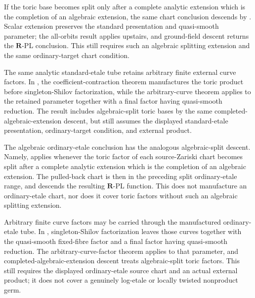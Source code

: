 If the toric base becomes split only after a complete analytic extension
which is the completion of an algebraic extension, the same chart conclusion
descends by .
Scalar extension preserves the standard presentation and quasi-smooth
parameter; the all-orbits result applies upstairs, and ground-field descent
returns the \(\mathbf R\)-PL conclusion.  This still requires such an
algebraic splitting extension and the same ordinary-target chart condition.

The same analytic standard-etale tube retains arbitrary finite external
curve factors.  In
,
the coefficient-contraction theorem manufactures the toric product before
singleton-Shilov factorization, while the arbitrary-curve theorem applies to
the retained parameter together with a final factor having quasi-smooth
reduction.  The result includes algebraic-split toric bases by the same
completed-algebraic-extension descent, but still assumes the displayed
standard-etale presentation, ordinary-target condition, and external
product.

The algebraic ordinary-etale conclusion has the analogous algebraic-split
descent.  Namely,
 applies whenever
the toric factor of each source-Zariski chart becomes split after a complete
analytic extension which is the completion of an algebraic extension.  The
pulled-back chart is then in the preceding split ordinary-etale range, and
\cite[Corollary~5.12]{GJR26} descends the resulting \(\mathbf R\)-PL
function.  This does not manufacture an ordinary-etale chart, nor does it
cover toric factors without such an algebraic splitting extension.

Arbitrary finite curve factors may be carried through the manufactured
ordinary-etale tube.  In
,
singleton-Shilov factorization leaves those curves together with the
quasi-smooth fixed-fibre factor and a final factor having quasi-smooth
reduction.  The arbitrary-curve-factor theorem applies to that parameter,
and completed-algebraic-extension descent treats algebraic-split toric
factors.  This still requires the displayed ordinary-etale source chart and
an actual external product; it does not cover a genuinely log-etale or
locally twisted nonproduct germ.


